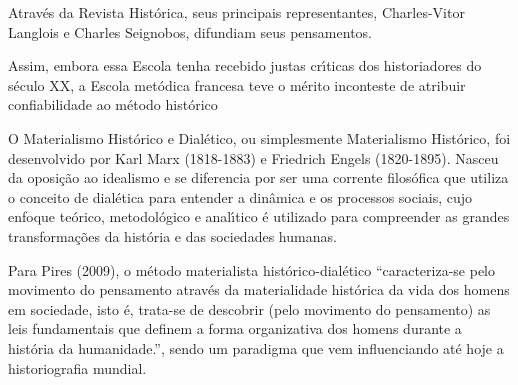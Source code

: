 \documentclass[
12pt,		%
openright,	%
twoside,  %
a4paper,			%
chapter=TITLE,		%
english,			%
french,				%
spanish,			%
brazil				%
]{USPSC-classe/USPSC}
\begin{document}
Atrav\'es da Revista Hist\'orica, seus principais representantes, Charles-Vitor Langlois e Charles Seignobos, difundiam seus pensamentos.















\noindent\begin{center}\mbox{\centering{}}\end{center}


Assim, embora essa Escola tenha recebido justas cr\'{\i}ticas dos historiadores do s\'eculo XX, a Escola met\'odica francesa teve o m\'erito inconteste de atribuir confiabilidade ao m\'etodo hist\'orico














O Materialismo Hist\'orico e Dial\'etico, ou simplesmente Materialismo Hist\'orico, foi desenvolvido  por Karl Marx (1818-1883) e Friedrich Engels (1820-1895). Nasceu da oposi\c{c}\~ao ao idealismo e se diferencia por ser uma corrente filos\'ofica que utiliza o conceito de dial\'etica para entender a din\^amica e os processos sociais, cujo enfoque te\'orico, metodol\'ogico e anal\'{\i}tico \'e utilizado para compreender as grandes transforma\c{c}\~oes da hist\'oria e das sociedades humanas.














Para  Pires (2009), o m\'etodo materialista hist\'orico-dial\'etico “caracteriza-se pelo movimento do pensamento atrav\'es da materialidade hist\'orica da vida dos homens em sociedade, isto \'e, trata-se de descobrir (pelo movimento do pensamento) as leis fundamentais que definem a forma organizativa dos homens durante a hist\'oria da humanidade.”, sendo um paradigma que vem influenciando at\'e hoje a historiografia mundial.
\end{document}
